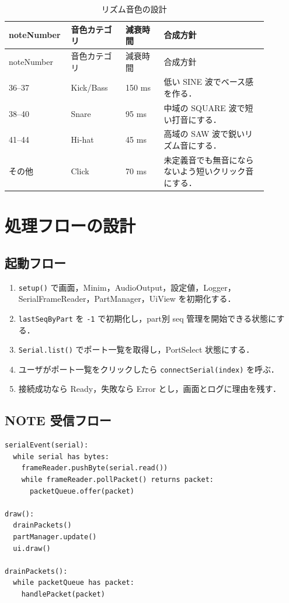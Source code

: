 \documentclass[lualatex,book,openany,paper=a4paper,jafontsize=11.5pt,jafontscale=1.05]{jlreq}
\begin{document}
\begin{longtable}{p{0.16\linewidth}p{0.20\linewidth}p{0.14\linewidth}p{0.38\linewidth}}
\caption{リズム音色の設計}\label{tab:rhythm}\\
\toprule
noteNumber & 音色カテゴリ & 減衰時間 & 合成方針 \\
\midrule
\endfirsthead
\toprule
noteNumber & 音色カテゴリ & 減衰時間 & 合成方針 \\
\midrule
\endhead
36--37 & Kick/Bass & 150 ms & 低い SINE 波でベース感を作る． \\
38--40 & Snare & 95 ms & 中域の SQUARE 波で短い打音にする． \\
41--44 & Hi-hat & 45 ms & 高域の SAW 波で鋭いリズム音にする． \\
その他 & Click & 70 ms & 未定義音でも無音にならないよう短いクリック音にする． \\
\bottomrule
\end{longtable}

\chapter{処理フローの設計}

\section{起動フロー}
\begin{enumerate}
  \item \texttt{setup()} で画面，Minim，AudioOutput，設定値，Logger，SerialFrameReader，PartManager，UiView を初期化する．
  \item \texttt{lastSeqByPart} を \texttt{-1} で初期化し，part別 seq 管理を開始できる状態にする．
  \item \texttt{Serial.list()} でポート一覧を取得し，PortSelect 状態にする．
  \item ユーザがポート一覧をクリックしたら \texttt{connectSerial(index)} を呼ぶ．
  \item 接続成功なら Ready，失敗なら Error とし，画面とログに理由を残す．
\end{enumerate}

\section{NOTE 受信フロー}
\begin{lstlisting}[style=pseudo, caption={NOTE 受信から発音までの処理フロー}, label={lst:receive-flow}]
serialEvent(serial):
  while serial has bytes:
    frameReader.pushByte(serial.read())
    while frameReader.pollPacket() returns packet:
      packetQueue.offer(packet)

draw():
  drainPackets()
  partManager.update()
  ui.draw()

drainPackets():
  while packetQueue has packet:
    handlePacket(packet)
\end{lstlisting}
\end{document}
